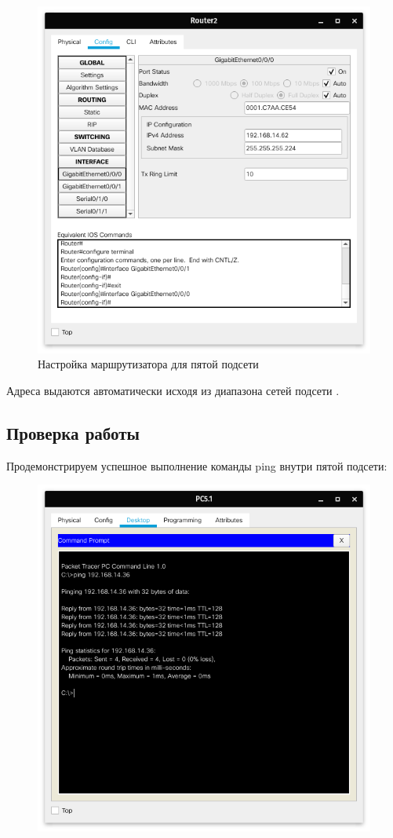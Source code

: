 \begin{figure}[H]
    \centering
    \includegraphics[width=0.8\linewidth]{images/src06.png}
    \caption{Настройка маршрутизатора для пятой подсети}%
    \label{fig:servers5}
\end{figure}

Адреса выдаются автоматически исходя из диапазона сетей подсети .

\subsection{Проверка работы}%
\label{sub:proverka_raboty}

Продемонстрируем успешное выполнение команды ping внутри пятой подсети:
\begin{figure}[H]
    \centering
    \includegraphics[width=0.8\linewidth]{images/src07.png}
\end{figure}


